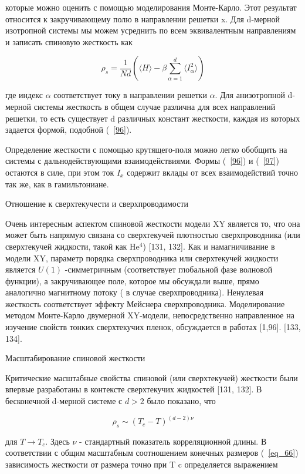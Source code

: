 \documentclass[11pt]{article}
\begin{document}
которые можно оценить с помощью моделирования Монте-Карло. Этот результат относится к закручивающему полю в направлении решетки x. Для d-мерной изотропной системы мы можем усреднить по всем эквивалентным направлениям и записать спиновую жесткость как

\begin{equation}
\rho_s = \frac{1}{Nd}(\langle H \rangle - \beta \sum\limits_{\alpha=1 }^{d} \langle I_{\alpha}^2\rangle)
\label{eq_97}
\end{equation}

где индекс $\alpha$ соответствует току в направлении решетки $\alpha$. Для анизотропной d-мерной системы жесткость в общем случае различна для всех направлений решетки, то есть существует d различных констант жесткости, каждая из которых задается формой, подобной (~\ref{96}).

Определение жесткости с помощью крутящего-поля можно легко обобщить на системы с дальнодействующими взаимодействиями. Формы (~\ref{96}) и (~\ref{97}) остаются в силе, при этом ток $I_x$ содержит вклады от всех взаимодействий точно так же, как в гамильтониане.

Отношение к сверхтекучести и сверхпроводимости

Очень интересным аспектом спиновой жесткости модели XY является то, что она может быть напрямую связана со сверхтекучей плотностью сверхпроводника (или сверхтекучей жидкости, такой как  He$^4$) [131, 132]. Как и намагничивание в модели XY, параметр порядка сверхпроводника или сверхтекучей жидкости является $U (1)$ -симметричным (соответствует глобальной фазе волновой функции), а закручивающее поле, которое мы обсуждали выше, прямо аналогично магнитному потоку ( в случае сверхпроводника). Ненулевая жесткость соответствует эффекту Мейснера сверхпроводника. Моделирование методом Монте-Карло двумерной XY-модели, непосредственно направленное на изучение свойств тонких сверхтекучих пленок, обсуждается в работах [1,96]. [133, 134].

Масштабирование спиновой жесткости

Критические масштабные свойства спиновой (или сверхтекучей) жесткости были впервые разработаны в контексте сверхтекучих жидкостей [131, 132]. В бесконечной d-мерной системе с $d> 2$ было показано, что

\begin{equation}
\rho_s \sim (T_c - T)^{(d-2)\nu }
\label{eq_98}
\end{equation}

для $T \to T_c$. Здесь $\nu$ - стандартный показатель корреляционной длины. В соответствии с общим масштабным соотношением конечных размеров (~\ref{eq_66}) зависимость жесткости от размера точно при T c определяется выражением
\end{document}
